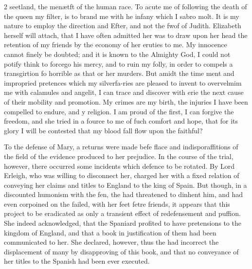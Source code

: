 \documentclass[10pt]{article}
\begin{document}
\begin{multicols}{2}\raggedcolumns
seetland, the menætft of the human race. To acute me of following the death of the queen my filter, is to brand me with he infany which I sabro molt. It is my nature to employ the direction and Efter, and not the fwof of Judith. Elizabeth herself will attach, that I have often admitted her was to draw upon her head the retention of my friends by the economy of her eruties to me. My innocence cannot finely be doubted; and it is known to the Almighty God, I could not potify think to forcego his mercy, and to ruin my folly, in order to compels a transgirtion fo horrible as that or her murders. But amidt the time ment and impropried pretences which my silverfa-ries are pleased to invent to overvelmim me with calamules and angelit, I can trace and discover with erie the next cause of their mobility and promotion. My crimes are my birth, the injuries I have been compelled to endure, and y religion. I am proud of the first, I can forgive the freedom, and she tried in a fource to me of fuch comfort and hope, that for its glory I will be contested that my blood fall flow upon the faithful?

To the defense of Mary, a returns were made befe flace and indisporaffitions of the field of the evidence produced to her prejudice. In the course of the trial, however, there occurred some incidents which defence to be rotated. By Lord Erleigh, who was willing to disconnect her, charged her with a fixed relation of conveying her claims and titles to England to the king of Spain. But though, in a discounted humonism with the fen, the had threatened to dinhent him, and had even corpoined on the failed, with her feet fetre friends, it appears that this project to be eradicated as only a transient effect of redefensement and puffion. She indeed acknowledged, that the Spaniard profited to have pretensions to the kingdom of England, and that a book in justification of them had been communicated to her. She declared, however, thus the had incorrect the displacement of many by disapproving of this book, and that no conveyance of her titles to the Spanish had been ever executed.


\end{multicols}
\end{document}
